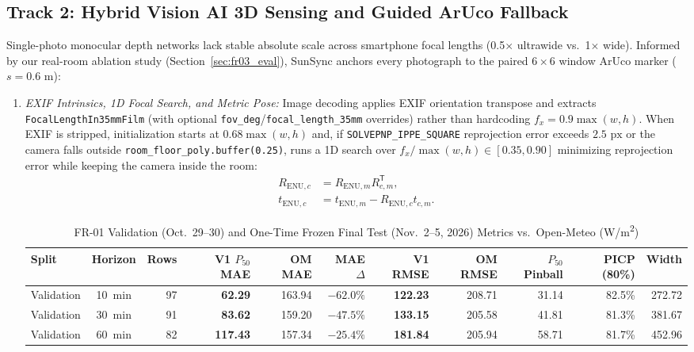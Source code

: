\documentclass[conference]{IEEEtran}
\begin{document}
\subsection{Track 2: Hybrid Vision AI 3D Sensing and Guided ArUco Fallback}
Single-photo monocular depth networks lack stable absolute scale across smartphone focal lengths (0.5$\times$ ultrawide vs.\ 1$\times$ wide). Informed by our real-room ablation study (Section~\ref{sec:fr03_eval}), SunSync anchors every photograph to the paired $6 \times 6$ window ArUco marker ($s = 0.6\text{ m}$):
\begin{enumerate}
\item \textit{EXIF Intrinsics, 1D Focal Search, and Metric Pose:} Image decoding applies EXIF orientation transpose and extracts \texttt{FocalLengthIn35mmFilm} (with optional \texttt{fov\_deg}/\texttt{focal\_length\_35mm} overrides) rather than hardcoding $f_x = 0.9\max(w, h)$. When EXIF is stripped, initialization starts at $0.68\max(w, h)$ and, if \texttt{SOLVEPNP\_IPPE\_SQUARE} \cite{b5} reprojection error exceeds $2.5\text{ px}$ or the camera falls outside \texttt{room\_floor\_poly.buffer(0.25)}, runs a 1D search over $f_x / \max(w, h) \in [0.35, 0.90]$ minimizing reprojection error while keeping the camera inside the room:
\begin{align}
R_{\mathrm{ENU},c} &= R_{\mathrm{ENU},m} R_{c,m}^{\mathsf{T}}, \nonumber\\
t_{\mathrm{ENU},c} &= t_{\mathrm{ENU},m} - R_{\mathrm{ENU},c} t_{c,m}.
\label{eq:pose}
\end{align}
\begin{table}[t]
\caption{FR-01 Validation (Oct.~29--30) and One-Time Frozen Final Test (Nov.~2--5, 2026) Metrics vs.\ Open-Meteo (W/m\textsuperscript{2})}
\label{tab:fr01_eval}
\centering
\footnotesize
\setlength{\tabcolsep}{4.5pt}
\renewcommand{\arraystretch}{1.10}
\begin{tabular}{@{}lcrrrrrrrrr@{}}
\toprule
\textbf{Split} & \textbf{Horizon} & \textbf{Rows} & \textbf{V1 $P_{50}$ MAE} & \textbf{OM MAE} & \textbf{MAE $\Delta$} & \textbf{V1 RMSE} & \textbf{OM RMSE} & \textbf{$P_{50}$ Pinball} & \textbf{PICP (80\%)} & \textbf{Width} \\
\midrule
Validation & 10~min & 97  & \textbf{62.29}  & 163.94 & $-62.0\%$ & \textbf{122.23} & 208.71 & 31.14 & 82.5\% & 272.72 \\
Validation & 30~min & 91  & \textbf{83.62}  & 159.20 & $-47.5\%$ & \textbf{133.15} & 205.58 & 41.81 & 81.3\% & 381.67 \\
Validation & 60~min & 82  & \textbf{117.43} & 157.34 & $-25.4\%$ & \textbf{181.84} & 205.94 & 58.71 & 81.7\% & 452.96 \\

\end{tabular}
\end{table}
\end{enumerate}
\end{document}

